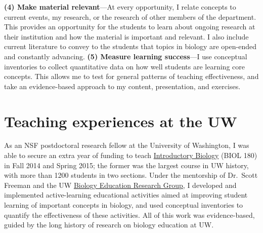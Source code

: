 \textbf{(4) Make material relevant}---At every opportunity, I relate concepts
to current events, my research, or the research of other members of the
department.
This provides an opportunity for the students to learn about ongoing
research at their institution and how the material is important and relevant.
I also include current literature to convey to the students that topics in
biology are open-ended and constantly advancing.
\textbf{(5) Measure learning success}---I use conceptual inventories to
collect quantitative data on how well students are learning core concepts.
This allows me to test for general patterns of teaching effectiveness, and take
an evidence-based approach to my content, presentation, and exercises.

\section*{Teaching experiences at the UW}
As an NSF postdoctoral research fellow at the University of Washington,
I was able to secure an extra year of funding to teach
\href{http://courses.biology.washington.edu/biol180/}{Introductory Biology}
(BIOL 180) in Fall 2014 and Spring 2015;
the former was the largest course in UW history, with more than 1200 students
in two sections.
Under the mentorship of Dr.\ Scott Freeman and the UW
\href{https://sites.google.com/site/uwbioedresgroup/home}{Biology Education
    Research Group}, I developed and implemented active-learning
educational activities aimed at improving student learning of important
concepts in biology,
and used conceptual inventories to quantify the effectiveness of these
activities.
All of this work was evidence-based, guided by the long history of research on
biology education at UW.

